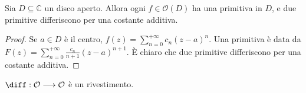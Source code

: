 \begin{lm} \label{primitiva}
  Sia $D \subseteq \mathbb{C}$ un disco aperto. Allora ogni $f \in \mathcal{O}(D)$ ha una primitiva in $D$, e due primitive differiscono per una costante additiva.
\end{lm}

\begin{proof}
  Se $a \in D$ è il centro, $\displaystyle f(z)=\sum_{n=0}^{+\infty} c_n(z-a)^n$. Una primitiva è data da $\displaystyle F(z)=\sum_{n=0}^{+\infty} \frac{c_n}{n+1}(z-a)^{n+1}$. È chiaro che due primitive differiscono per una costante additiva.
\end{proof}

\begin{prop}
  $\diff:\mathcal{O} \longrightarrow \mathcal{O}$ è un rivestimento.
\end{prop}

